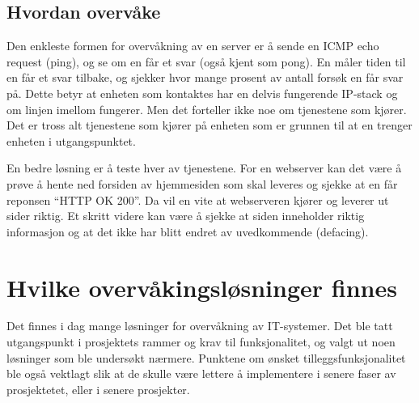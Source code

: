 \subsection{Hvordan overvåke}
Den enkleste formen for overvåkning av en server er å sende en ICMP echo request (ping), og se om en får et svar (også kjent som pong). En måler tiden til en får et svar tilbake, og sjekker hvor mange prosent av antall forsøk en får svar på. Dette betyr at enheten som kontaktes har en delvis fungerende IP-stack og om linjen imellom fungerer. Men det forteller ikke noe om tjenestene som kjører. Det er tross alt tjenestene som kjører på enheten som er grunnen til at en trenger enheten i utgangspunktet.

En bedre løsning er å teste hver av tjenestene. For en webserver kan det være å prøve å hente ned forsiden av hjemmesiden som skal leveres og sjekke at en får reponsen ``HTTP OK 200''. Da vil en vite at webserveren kjører og leverer ut sider riktig. Et skritt videre kan være å sjekke at siden inneholder riktig informasjon og at det ikke har blitt endret av uvedkommende (defacing).

\section{Hvilke overvåkingsløsninger finnes}\label{sec:hvilkefinnes}
Det finnes i dag mange løsninger for overvåkning av IT-systemer\cite{wiki:networkmonitoring}. Det ble tatt utgangspunkt i prosjektets rammer og krav til funksjonalitet, og valgt ut noen løsninger som ble undersøkt nærmere. Punktene om ønsket tilleggsfunksjonalitet ble også vektlagt slik at de skulle være lettere å implementere i senere faser av prosjektetet, eller i senere prosjekter. 

